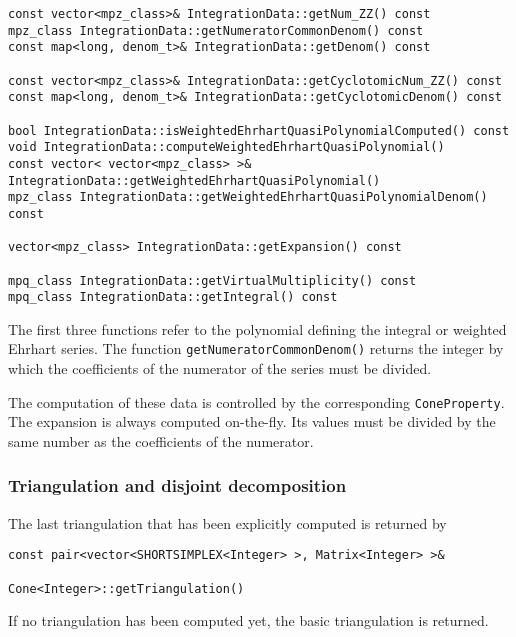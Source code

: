 \begin{small}
\begin{Verbatim}
const vector<mpz_class>& IntegrationData::getNum_ZZ() const
mpz_class IntegrationData::getNumeratorCommonDenom() const
const map<long, denom_t>& IntegrationData::getDenom() const

const vector<mpz_class>& IntegrationData::getCyclotomicNum_ZZ() const
const map<long, denom_t>& IntegrationData::getCyclotomicDenom() const

bool IntegrationData::isWeightedEhrhartQuasiPolynomialComputed() const
void IntegrationData::computeWeightedEhrhartQuasiPolynomial()
const vector< vector<mpz_class> >& IntegrationData::getWeightedEhrhartQuasiPolynomial()
mpz_class IntegrationData::getWeightedEhrhartQuasiPolynomialDenom() const

vector<mpz_class> IntegrationData::getExpansion() const

mpq_class IntegrationData::getVirtualMultiplicity() const
mpq_class IntegrationData::getIntegral() const
\end{Verbatim}

The first three functions refer to the polynomial defining the integral or weighted Ehrhart series. The function \verb|getNumeratorCommonDenom()| returns the integer by which the coefficients of the numerator of the series must be divided.

The computation of these data is controlled by the corresponding \verb|ConeProperty|. The expansion is always computed on-the-fly. Its values must be divided by the same number as the coefficients of the numerator.

\subsubsection{Triangulation and disjoint decomposition}

The last triangulation that has been explicitly computed is returned by
\begin{Verbatim}
const pair<vector<SHORTSIMPLEX<Integer> >, Matrix<Integer> >&
                                                Cone<Integer>::getTriangulation()
\end{Verbatim}
If no triangulation has been computed yet, the basic triangulation is returned.


\end{small}
